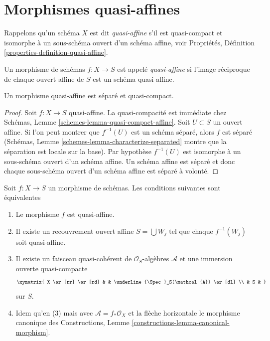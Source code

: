 \section{Morphismes quasi-affines}
\label{section-quasi-affine}

\noindent
Rappelons qu'un schéma $X$ est dit {\it quasi-affine}
s'il est quasi-compact et isomorphe à un sous-schéma ouvert
d'un schéma affine, voir Propriétés, Définition \ref{properties-definition-quasi-affine}.

\begin{definition}
\label{definition-quasi-affine}
Un morphisme de schémas $f : X \to S$ est appelé {\it quasi-affine} si
l'image réciproque de chaque ouvert affine de $S$ est un schéma quasi-affine.
\end{definition}

\begin{lemma}
\label{lemma-quasi-affine-separated}
Un morphisme quasi-affine est séparé et quasi-compact.
\end{lemma}

\begin{proof}
Soit $f : X \to S$ quasi-affine. La
quasi-compacité est immédiate
chez Schémas, Lemme \ref{schemes-lemma-quasi-compact-affine}. Soit $U \subset S$ un
ouvert affine. Si l'on peut montrer que $f^{-1}(U)$
est un schéma séparé, alors $f$ est séparé
(Schémas, Lemme \ref{schemes-lemma-characterize-separated} montre que la séparation
est locale sur la base). Par hypothèse $f^{-1}(U)$
est isomorphe à un sous-schéma ouvert d'un schéma
affine. Un schéma affine est séparé et donc chaque sous-schéma
ouvert d'un schéma affine est séparé à volonté.
\end{proof}

\begin{lemma}
\label{lemma-characterize-quasi-affine}
Soit $f : X \to S$ un morphisme de schémas. Les conditions
suivantes sont équivalentes
\begin{enumerate}
\item Le morphisme $f$ est quasi-affine.
\item Il existe un recouvrement ouvert affine $S = \bigcup W_j$ tel
que chaque $f^{-1}(W_j)$ soit quasi-affine.
\item Il existe un faisceau quasi-cohérent de $\mathcal{O}_S$-algèbres $\mathcal{A}$
et une immersion ouverte quasi-compacte
$$
\xymatrix{
X \ar[rr] \ar[rd] & & \underline{\Spec}_S(\mathcal{A}) \ar[dl] \\
& S &
}
$$
sur $S$.
\item Idem qu'en (3) mais avec $\mathcal{A} = f_*\mathcal{O}_X$ et
la flèche horizontale le morphisme
canonique des Constructions, Lemme \ref{constructions-lemma-canonical-morphism}.
\end{enumerate}
\end{lemma}

